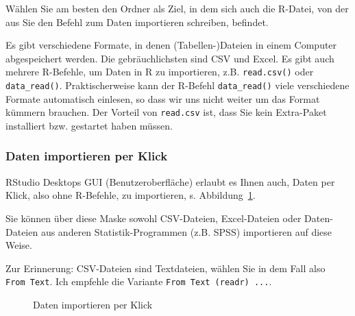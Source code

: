\documentclass[
  a4paper,
  DIV=11]{scrreprt}
\theoremstyle{definition}
\theoremstyle{definition}
\theoremstyle{definition}
\theoremstyle{remark}
\begin{document}
Wählen Sie am besten den Ordner als Ziel, in dem sich auch die R-Datei,
von der aus Sie den Befehl zum Daten importieren schreiben, befindet.

\begin{tcolorbox}[enhanced jigsaw, leftrule=.75mm, opacitybacktitle=0.6, colback=white, colframe=quarto-callout-note-color-frame, coltitle=black, colbacktitle=quarto-callout-note-color!10!white, opacityback=0, left=2mm, breakable, titlerule=0mm, toptitle=1mm, bottomtitle=1mm, rightrule=.15mm, title=\textcolor{quarto-callout-note-color}{\faInfo}\hspace{0.5em}{Hinweis}, arc=.35mm, bottomrule=.15mm, toprule=.15mm]

Es gibt verschiedene Formate, in denen (Tabellen-)Dateien in einem
Computer abgespeichert werden. Die gebräuchlichsten sind CSV und Excel.
Es gibt auch mehrere R-Befehle, um Daten in R zu importieren, z.B.
\texttt{read.csv()} oder \texttt{data\_read()}. Praktischerweise kann
der R-Befehl \texttt{data\_read()} viele verschiedene Formate
automatisch einlesen, so dass wir uns nicht weiter um das Format kümmern
brauchen. Der Vorteil von \texttt{read.csv} ist, dass Sie kein
Extra-Paket installiert bzw. gestartet haben müssen.

\end{tcolorbox}

\subsubsection{Daten importieren per
Klick}\label{daten-importieren-per-klick}

RStudio Desktops GUI (Benutzeroberfläche) erlaubt es Ihnen auch, Daten
per Klick, also ohne R-Befehle, zu importieren, s.
Abbildung~\ref{fig-daten-rstudio}.

Sie können über diese Maske sowohl CSV-Dateien, Excel-Dateien oder
Daten-Dateien aus anderen Statistik-Programmen (z.B. SPSS) importieren
auf diese Weise.

Zur Erinnerung: CSV-Dateien sind Textdateien, wählen Sie in dem Fall
also \texttt{From\ Text}. Ich empfehle die Variante
\texttt{From\ Text\ (readr)\ ...}.

\begin{figure}


\caption{\label{fig-daten-rstudio}Daten importieren per Klick}

\end{figure}%
\end{document}
